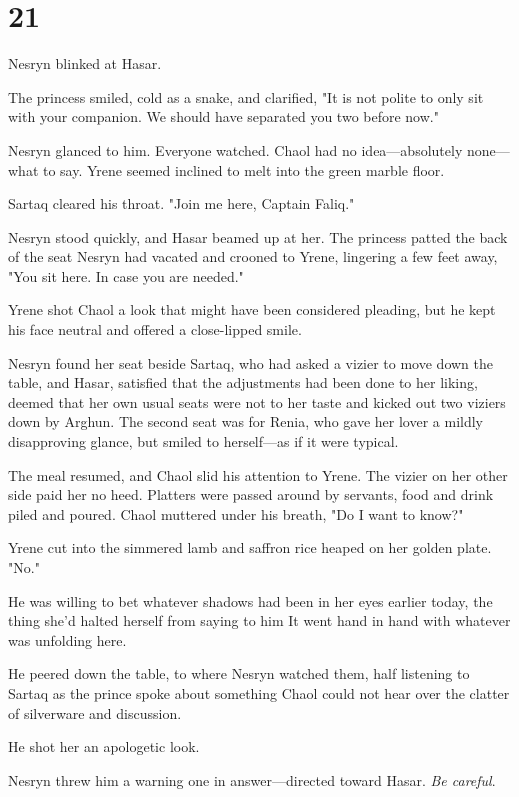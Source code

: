 
\chapter{21}

Nesryn blinked at Hasar.

The princess smiled, cold as a snake, and clarified, "It is not polite to only sit with your companion. We should have separated you two before now."

Nesryn glanced to him. Everyone watched. Chaol had no idea---absolutely none---what to say. Yrene seemed inclined to melt into the green marble floor.

Sartaq cleared his throat. "Join me here, Captain Faliq."

Nesryn stood quickly, and Hasar beamed up at her. The princess patted the back of the seat Nesryn had vacated and crooned to Yrene, lingering a few feet away, "You sit here. In case you are needed."

Yrene shot Chaol a look that might have been considered pleading, but he kept his face neutral and offered a close-lipped smile.

Nesryn found her seat beside Sartaq, who had asked a vizier to move down the table, and Hasar, satisfied that the adjustments had been done to her liking, deemed that her own usual seats were not to her taste and kicked out two viziers down by Arghun. The second seat was for Renia, who gave her lover a mildly disapproving glance, but smiled to herself---as if it were typical.

The meal resumed, and Chaol slid his attention to Yrene. The vizier on her other side paid her no heed. Platters were passed around by servants, food and drink piled and poured. Chaol muttered under his breath, "Do I want to know?"

Yrene cut into the simmered lamb and saffron rice heaped on her golden plate. "No."

He was willing to bet whatever shadows had been in her eyes earlier today, the thing she'd halted herself from saying to him  It went hand in hand with whatever was unfolding here.

He peered down the table, to where Nesryn watched them, half listening to Sartaq as the prince spoke about something Chaol could not hear over the clatter of silverware and discussion.

He shot her an apologetic look.

Nesryn threw him a warning one in answer---directed toward Hasar.
\emph{Be careful}.

